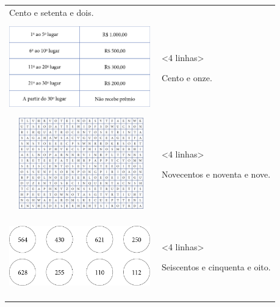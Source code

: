 \begin{longtable}[]{@{}ll@{}}
\begin{minipage}[t]{0.48\columnwidth}
Cento e setenta e dois.\strut
\end{minipage}\tabularnewline
\begin{minipage}[t]{0.48\columnwidth}\raggedright\strut
\includegraphics[width=2.40625in,height=1.53287in]{media/image10.png}\strut
\end{minipage} & \begin{minipage}[t]{0.48\columnwidth}\raggedright\strut
\textless{}4 linhas\textgreater{}

Cento e onze.\strut
\end{minipage}\tabularnewline
\begin{minipage}[t]{0.48\columnwidth}\raggedright\strut
\includegraphics[width=2.45833in,height=1.55359in]{media/image11.png}\strut
\end{minipage} & \begin{minipage}[t]{0.48\columnwidth}\raggedright\strut
\textless{}4 linhas\textgreater{}

Novecentos e noventa e nove.\strut
\end{minipage}\tabularnewline
\begin{minipage}[t]{0.48\columnwidth}\raggedright\strut
\includegraphics[width=2.40625in,height=1.40287in]{media/image12.png}\strut
\end{minipage} & \begin{minipage}[t]{0.48\columnwidth}\raggedright\strut
\textless{}4 linhas\textgreater{}

Seiscentos e cinquenta e oito.\strut
\end{minipage}\tabularnewline
\bottomrule
\end{longtable}

